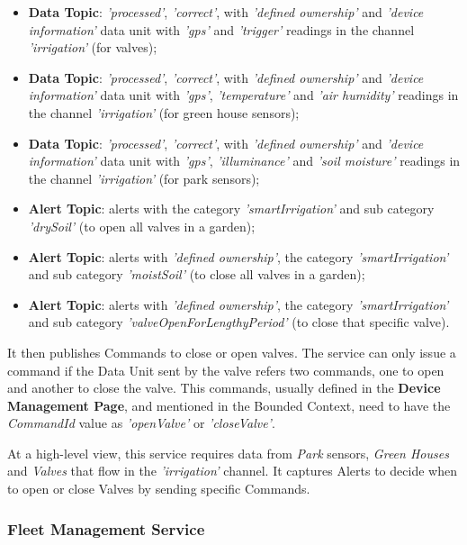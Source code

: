 \begin{itemize}
    \item \textbf{Data Topic}: \textit{'processed'}, \textit{'correct'}, with \textit{'defined ownership'} and \textit{'device information'} data unit with \textit{'gps'} and \textit{'trigger'} readings in the channel \textit{'irrigation'} (for valves);
    \item \textbf{Data Topic}: \textit{'processed'}, \textit{'correct'}, with \textit{'defined ownership'} and \textit{'device information'} data unit with \textit{'gps'}, \textit{'temperature'} and \textit{'air humidity'} readings in the channel \textit{'irrigation'} (for green house sensors);
    \item \textbf{Data Topic}: \textit{'processed'}, \textit{'correct'}, with \textit{'defined ownership'} and \textit{'device information'} data unit with \textit{'gps'}, \textit{'illuminance'} and \textit{'soil moisture'} readings in the channel \textit{'irrigation'} (for park sensors);
    \item \textbf{Alert Topic}: alerts with the category \textit{'smartIrrigation'} and sub category \textit{'drySoil'} (to open all valves in a garden);
    \item \textbf{Alert Topic}: alerts with \textit{'defined ownership'}, the category \textit{'smartIrrigation'} and sub category \textit{'moistSoil'} (to close all valves in a garden);
    \item \textbf{Alert Topic}: alerts with \textit{'defined ownership'}, the category \textit{'smartIrrigation'} and sub category \textit{'valveOpenForLengthyPeriod'} (to close that specific valve).
\end{itemize}

It then publishes Commands to close or open valves. The service can only issue a command if the Data Unit sent by the valve refers two commands, one to open and another to close the valve. This commands, usually defined in the \textbf{Device Management Page}, and mentioned in the  Bounded Context, need to have the \textit{CommandId} value as \textit{'openValve'} or \textit{'closeValve'}.

At a high-level view, this service requires data from \textit{Park} sensors, \textit{Green Houses} and \textit{Valves} that flow in the \textit{'irrigation'} channel. It captures Alerts to decide when to open or close Valves by sending specific Commands.

\subsubsection{Fleet Management Service}
\label{subsubsec:implementation:description:services:fleet}

